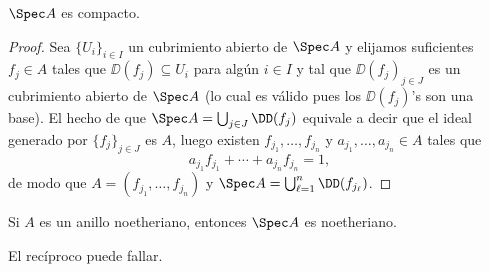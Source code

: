 \begin{thm}
	$\Spec A$ es compacto.
\end{thm}
\begin{proof}
	Sea $\{ U_i \}_{i\in I}$ un cubrimiento abierto de $\Spec A$ y elijamos suficientes $f_j \in A$ tales que $\DD(f_j) \subseteq U_i$ para algún $i \in I$
	y tal que ${ \DD(f_j) }_{j\in J}$ es un cubrimiento abierto de $\Spec A$ (lo cual es válido pues los $\DD(f_j)$'s son una base).
	El hecho de que $\Spec A = \bigcup_{j\in J} \DD(f_j)$ equivale a decir que el ideal generado por $\{ f_j \}_{j\in J}$ es $A$, luego existen
	$f_{j_1}, \dots, f_{j_n}$ y $a_{j_1}, \dots, a_{j_n} \in A$ tales que
	$$ a_{j_1} f_{j_1} + \cdots + a_{j_n} f_{j_n} = 1, $$
	de modo que $A = (f_{j_1}, \dots, f_{j_n})$ y $\Spec A = \bigcup_{\ell=1}^n \DD( f_{j_\ell} )$.
\end{proof}
\begin{thm}
	Si $A$ es un anillo noetheriano, entonces $\Spec A$ es noetheriano.
\end{thm}
El recíproco puede fallar.

